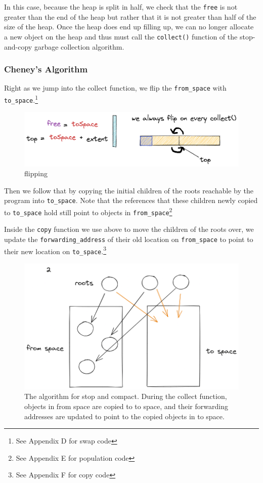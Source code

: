 \documentclass[index]{subfiles}
\begin{document}
In this case, because the heap is split in half, we check that the \verb+free+ is not greater than the end of the heap but rather that it is not greater than half of the size of the heap. Once the heap does end up filling up, we can no longer allocate a new object on the heap and thus must call the \verb+collect()+ function of the stop-and-copy garbage collection algorithm.

\subsubsection{Cheney's Algorithm}

Right as we jump into the collect function, we flip the \verb+from_space+ with \verb+to_space+.\footnote{See Appendix D for swap code}

\begin{figure}[H]
    \centering
    \includegraphics[scale=0.25]{pics/flipping.png}
    \caption{flipping}
\end{figure}

Then we follow that by copying the initial children of the roots reachable by the program into \verb+to_space+. Note that the references that these children newly copied to \verb+to_space+ hold still point to objects in \verb+from_space+\footnote{See Appendix E for population code}

Inside the \verb+copy+ function we use above to move the children of the roots over, we update the \verb+forwarding_address+ of their old location on \verb+from_space+ to point to their new location on \verb+to_space+.\footnote{See Appendix F for copy code}

\begin{figure}[H]
    \centering
    \includegraphics[scale=0.3]{pics/visualization-of-worklist.png}
    \caption{The algorithm for stop and compact. During the collect function, objects in from space are copied to to space, and their forwarding addresses are updated to point to the copied objects in to space.}
\end{figure}
\end{document}
